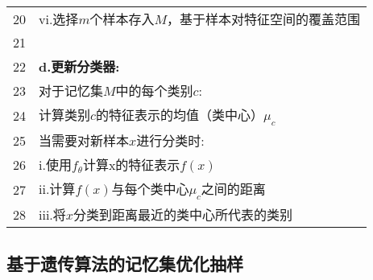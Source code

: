 \begin{table}[htbp]
\begin{tabularx}{1.0\textwidth}{cl}
   20&\quad\quad\quad vi.选择$m$个样本存入$M$，基于样本对特征空间的覆盖范围\\
   21&\\
   22&\quad\textbf{d.更新分类器:} \\
   23&\quad\quad 对于记忆集$M$中的每个类别$c$: \\
   24&\quad\quad\quad 计算类别$c$的特征表示的均值（类中心）$\mu_c$\\
   25&\quad\quad 当需要对新样本$x$进行分类时:\\
   26&\quad\quad\quad i.使用$f_{\theta}$计算x的特征表示$f(x)$\\
   27&\quad\quad\quad ii.计算$f(x)$与每个类中心$\mu_c$之间的距离\\
   28&\quad\quad\quad iii.将$x$分类到距离最近的类中心所代表的类别\\
   \bottomrule
   \end{tabularx}
  \end{table}
\subsection{基于遗传算法的记忆集优化抽样}





